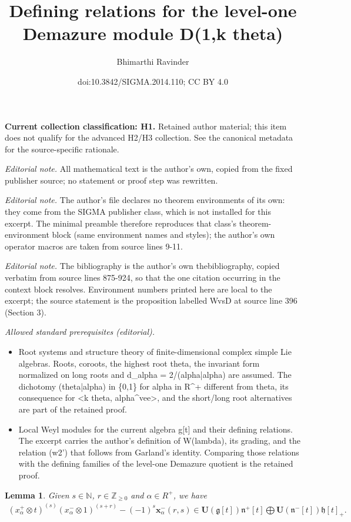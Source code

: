 \documentclass[10pt,a4paper]{amsart}
\title{Defining relations for the level-one Demazure module D(1,k theta)}
\author{Bhimarthi Ravinder}
\date{doi:10.3842/SIGMA.2014.110; CC BY 4.0}
\newtheorem{lemma}{Lemma}
\begin{document}
\maketitle
\par\medskip\noindent\textbf{Current collection classification: H1.} Retained author material; this item does not qualify for the advanced H2/H3 collection. See the canonical metadata for the source-specific rationale.\par\medskip

\noindent\textit{Editorial note.} All mathematical text is the author's own, copied from the fixed publisher source; no statement or proof step was rewritten.\par\medskip
\noindent\textit{Editorial note.} The author's file declares no theorem environments of its own: they come from the SIGMA publisher class, which is not installed for this excerpt. The minimal preamble therefore reproduces that class's theorem-environment block (same environment names and styles); the author's own operator macros are taken from source lines 9-11.\par\medskip
\noindent\textit{Editorial note.} The bibliography is the author's own thebibliography, copied verbatim from source lines 875-924, so that the one citation occurring in the context block resolves. Environment numbers printed here are local to the excerpt; the source statement is the proposition labelled WvsD at source line 396 (Section 3).\par\medskip
\noindent\textit{Allowed standard prerequisites (editorial).}\begin{itemize}
\item Root systems and structure theory of finite-dimensional complex simple Lie algebras. Roots, coroots, the highest root theta, the invariant form normalized on long roots and d\_alpha = 2/(alpha|alpha) are assumed. The dichotomy (theta|alpha) in \{0,1\} for alpha in R\textasciicircum{}+ different from theta, its consequence for <k theta, alpha\textasciicircum{}vee>, and the short/long root alternatives are part of the retained proof.
\item Local Weyl modules for the current algebra g[t] and their defining relations. The excerpt carries the author's definition of W(lambda), its grading, and the relation (w2') that follows from Garland's identity. Comparing those relations with the defining families of the level-one Demazure quotient is the retained proof.
\end{itemize}\medskip
\begin{lemma}\label{garland}
Given $s\in\mathbb{N}$, $r\in\mathbb{Z}_{\geq0}$ and $\alpha\in R^{+}$, we have
\begin{gather*}
(x^{+}_{\alpha} \otimes t)^{(s)}(x^{-}_{\alpha} \otimes
1)^{(s+r)}-(-1)^s\mathbf{x}^{-}_{\alpha}(r,s)\in\mathbf{U}(\mathfrak{g}[t])\mathfrak{n}^{+}[t]\bigoplus
\mathbf{U}(\mathfrak{n}^{-}[t])\mathfrak{h}[t]_{+}.
\end{gather*}
\end{lemma}
\end{document}
